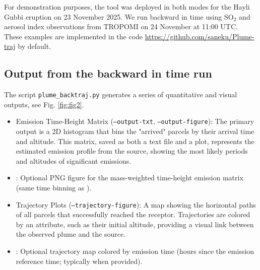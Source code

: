 \documentclass[11pt]{article}
\begin{document}
For demonstration purposes, the tool was deployed in both modes for the Hayli Gubbi eruption on 23 November 2025. We run backward in time using SO$_2$ and aerosol index observations from TROPOMI on 24 November at 11:00 UTC. These examples are implemented in the code \url{https://github.com/saneku/Plume-traj} by default.

\subsection{Output from the backward in time run}
The script \texttt{plume\_backtraj.py} generates a series of quantitative and visual outputs, see Fig. \ref{fig:fig2}.


\begin{itemize}
    \item Emission Time-Height Matrix (\texttt{--output-txt}, \texttt{--output-figure}): The primary output is a 2D histogram that bins the "arrived" parcels by their arrival time and altitude. This matrix, saved as both a text file and a plot, represents the estimated emission profile from the source, showing the most likely periods and altitudes of significant emissions.

    \item {}: Optional PNG figure for the mass-weighted time-height emission matrix (same time binning as ).

    \item Trajectory Plots (\texttt{--trajectory-figure}): A map showing the horizontal paths of all parcels that successfully reached the receptor. Trajectories are colored by an attribute, such as their initial altitude, providing a visual link between the observed plume and the source.

    \item {}: Optional trajectory map colored by emission time (hours since the emission reference time; typically  when provided).



\end{itemize}
\end{document}
